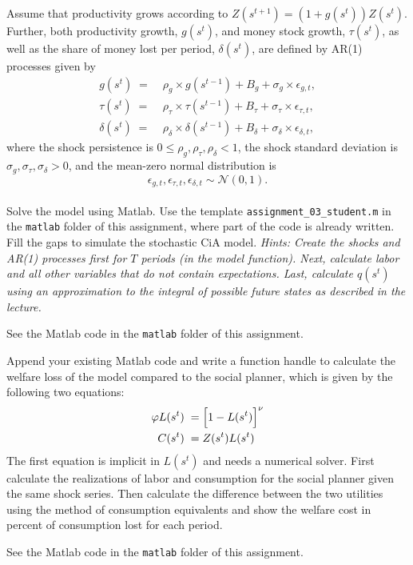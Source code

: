 \documentclass[a4paper, 12pt]{article}
\begin{document}
\begin{Exercise}[title={ADDITIONAL: Solving the stochastic model with Matlab},label=ex_3]%
	Assume that productivity grows according to $Z(s^{t+1}) = (1+g(s^t)) Z(s^t)$. Further, both productivity growth, $g(s^t)$, and money stock growth, $\tau(s^t)$, as well as the share of money lost per period, $\delta(s^t)$, are defined by AR(1) processes given by%
	\begin{align*}%
		g(s^t) \; = & \; \rho_g \times g(s^{t-1}) + B_g + \sigma_g \times \epsilon_{g,t},\\%
		\tau (s^t) \; = & \; \rho_\tau \times \tau(s^{t-1}) + B_\tau + \sigma_\tau \times \epsilon_{\tau,t},\\%
		\delta (s^t) \; = & \; \rho_\delta \times \delta (s^{t-1}) + B_\delta + \sigma_\delta \times \epsilon_{\delta,t},%
	\end{align*}%
	where the shock persistence is $0 \leq \rho_g,\rho_\tau,\rho_\delta < 1$, the shock standard deviation is $\sigma_g,\sigma_\tau, \sigma_\delta >0$, and the mean-zero normal distribution is $$\epsilon_{g,t}, \epsilon_{\tau,t}, \epsilon_{\delta,t} \sim \mathcal{N}(0,1).$$\\%
	Solve the model using Matlab. Use the template \texttt{assignment\_03\_student.m} in the \texttt{matlab} folder of this assignment, where part of the code is already written. Fill the gaps to simulate the stochastic CiA model. \textit{Hints: Create the shocks and AR(1) processes first for $T$ periods (in the model function). Next, calculate labor and all other variables that do not contain expectations. Last, calculate $q(s^t)$ using an approximation to the integral of possible future states as described in the lecture.}%
\end{Exercise}%
\bigskip%
\begin{Answer}%
	See the Matlab code in the \texttt{matlab} folder of this assignment.%
\end{Answer}%
\bigskip%
\begin{Exercise}[title={ADDITIONAL: Stochastic inflation and welfare},label=ex_4]%
	Append your existing Matlab code and write a function handle to calculate the welfare loss of the model compared to the social planner, which is given by the following two equations:%
	\begin{align*}%
		\varphi L(s^t) \; = & \; \Bigl[1-L(s^t)\Bigr]^{\nu}\\%
		C(s^t) \; = & \; Z(s^t) L(s^t)%
	\end{align*}%
	The first equation is implicit in $L(s^t)$ and needs a numerical solver. First calculate the realizations of labor and consumption for the social planner given the same shock series. Then calculate the difference between the two utilities using the method of consumption equivalents and show the welfare cost in percent of consumption lost for each period.%
\end{Exercise}%
\bigskip%
\begin{Answer}%
	See the Matlab code in the \texttt{matlab} folder of this assignment.%
\end{Answer}%
\bigskip%
\end{document}
